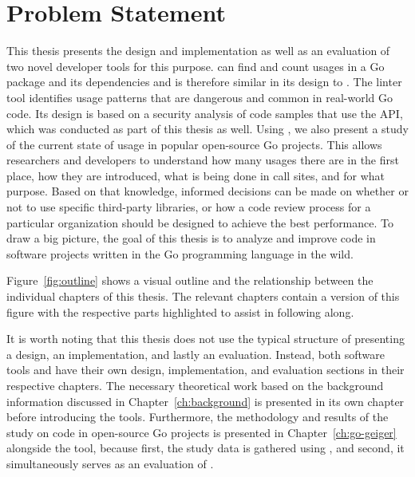 
\section{Problem Statement}\label{sec:introduction:problem-statement}

This thesis presents the design and implementation as well as an evaluation of two novel developer tools for this
purpose.
\toolGeiger{} can find and count \unsafe{} usages in a Go package and its dependencies and is therefore similar in its
design to \toolCargoGeiger{}.
The linter tool \toolSafer{} identifies \unsafe{} usage patterns that are dangerous and common in real-world Go code.
Its design is based on a security analysis of code samples that use the \unsafe{} \acrshort{API}, which was conducted as
part of this thesis as well.
Using \toolGeiger{}, we also present a study of the current state of \unsafe{} usage in popular open-source Go projects.
This allows researchers and developers to understand how many usages there are in the first place, how they are
introduced, what is being done in \unsafe{} call sites, and for what purpose.
Based on that knowledge, informed decisions can be made on whether or not to use specific third-party libraries, or how
a code review process for a particular organization should be designed to achieve the best performance.
To draw a big picture, the goal of this thesis is to analyze and improve \unsafe{} code in software projects written in
the Go programming language in the wild.

Figure~\ref{fig:outline} shows a visual outline and the relationship between the individual chapters of this thesis.
The relevant chapters contain a version of this figure with the respective parts highlighted to assist in following
along.



It is worth noting that this thesis does not use the typical structure of presenting a design, an implementation, and
lastly an evaluation.
Instead, both software tools \toolGeiger{} and \toolSafer{} have their own design, implementation, and evaluation
sections in their respective chapters.
The necessary theoretical work based on the background information discussed in Chapter~\ref{ch:background} is presented
in its own chapter before introducing the tools.
Furthermore, the methodology and results of the study on \unsafe{} code in open-source Go projects is presented in
Chapter~\ref{ch:go-geiger} alongside the \toolGeiger{} tool, because first, the study data is gathered using \toolGeiger,
and second, it simultaneously serves as an evaluation of \toolGeiger{}.


